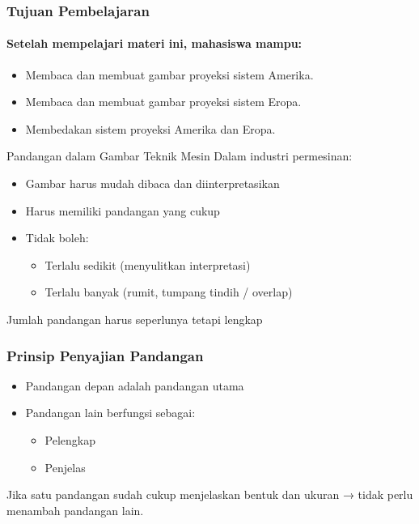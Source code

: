 \documentclass[../gbr_teknik.tex]{subfiles}
\begin{document}
\begin{frame}[mytitle=center,c,mycolor=digiPH_uniblue,light]\frametitle{Tujuan Pembelajaran}

	\framesubtitle{Setelah mempelajari materi ini, mahasiswa mampu:}
	\begin{itemize}
		\item Membaca dan membuat gambar proyeksi sistem Amerika.
		\item Membaca dan membuat gambar proyeksi sistem Eropa.
		\item Membedakan sistem proyeksi Amerika dan Eropa.
	\end{itemize}
\end{frame}

\begin{frame}[mytitle=center,c,mycolor=digiPH_cream,light]Pandangan dalam Gambar Teknik Mesin
	Dalam industri permesinan:

	\begin{itemize}
		\item Gambar harus mudah dibaca dan diinterpretasikan
		\item Harus memiliki pandangan yang cukup
		\item Tidak boleh:
		      \begin{itemize}
			      \item Terlalu sedikit (menyulitkan interpretasi)
			      \item Terlalu banyak (rumit, tumpang tindih / overlap)
		      \end{itemize}
	\end{itemize}


	\tabitem Jumlah pandangan harus seperlunya tetapi lengkap\end{frame}

\begin{frame}[mytitle=standard,c,mycolor=digiPH_leaf,dark]
	\frametitle{Prinsip Penyajian Pandangan}

	\begin{itemize}
		\item Pandangan depan adalah pandangan utama
		\item Pandangan lain berfungsi sebagai:
		      \begin{itemize}
			      \item Pelengkap
			      \item Penjelas
		      \end{itemize}
	\end{itemize}

	Jika satu pandangan sudah cukup menjelaskan bentuk dan ukuran → tidak perlu menambah pandangan lain.\end{frame}
\end{document}
